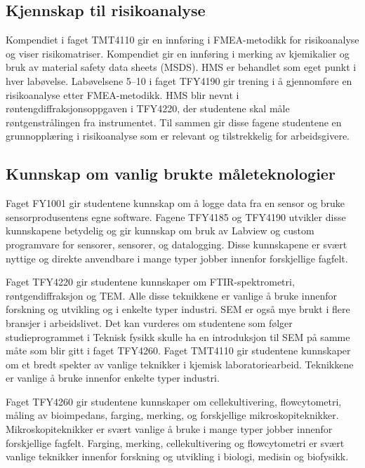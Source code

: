 \documentclass{article}
\begin{document}
\subsection{Kjennskap til risikoanalyse}
Kompendiet i faget TMT4110 gir en innføring i FMEA-metodikk for risikoanalyse og viser risikomatriser. Kompendiet gir en innføring i merking av kjemikalier og bruk av material safety data sheets (MSDS). HMS er behandlet som eget punkt i hver labøvelse. Labøvelsene 5--10 i faget TFY4190 gir trening i å gjennomføre en risikoanalyse etter FMEA-metodikk. HMS blir nevnt i røntengdiffraksjonsoppgaven i TFY4220, der studentene skal måle røntgenstrålingen fra instrumentet.
Til sammen gir disse fagene studentene en grunnopplæring i risikoanalyse som er relevant og tilstrekkelig for arbeidsgivere.

\subsection{Kunnskap om vanlig brukte måleteknologier}
Faget FY1001 gir studentene kunnskap om å logge data fra en sensor og bruke sensorprodusentens egne software. Fagene TFY4185 og TFY4190 utvikler disse kunnskapene betydelig og gir kunnskap om bruk av Labview og custom programvare for sensorer, sensorer, og datalogging. Disse kunnskapene er svært nyttige og direkte anvendbare i mange typer jobber innenfor forskjellige fagfelt.

Faget TFY4220 gir studentene kunnskaper om FTIR-spektrometri, røntgendiffraksjon og TEM. Alle disse teknikkene er vanlige å bruke innenfor forskning og utvikling og i enkelte typer industri. SEM er også mye brukt i flere bransjer i arbeidslivet. Det kan vurderes om studentene som følger studieprogrammet i Teknisk fysikk skulle ha en introduksjon til SEM på samme måte som blir gitt i faget TFY4260.
Faget TMT4110 gir studentene kunnskaper om et bredt spekter av vanlige teknikker i kjemisk laboratoriearbeid. Teknikkene er vanlige å bruke innenfor enkelte typer industri.

Faget TFY4260 gir studentene kunnskaper om cellekultivering, flowcytometri, måling av bioimpedans, farging, merking, og forskjellige mikroskopiteknikker. Mikroskopiteknikker er svært vanlige å bruke i mange typer jobber innenfor forskjellige fagfelt. Farging, merking, cellekultivering og flowcytometri er svært vanlige teknikker innenfor forskning og utvikling i biologi, medisin og biofysikk.
\end{document}
